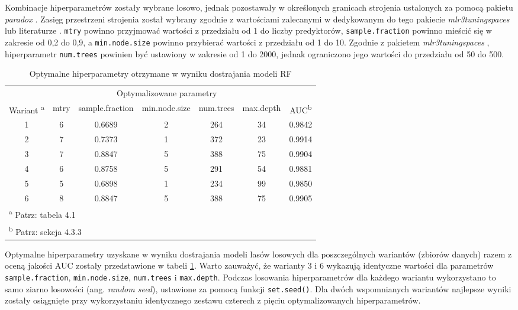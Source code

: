 \documentclass{amuthesis}
\begin{document}
Kombinacje hiperparametrów zostały wybrane losowo, jednak pozostawały w
określonych granicach strojenia ustalonych za pomocą pakietu
\emph{paradox} \autocite{R-paradox}. Zasięg przestrzeni strojenia został
wybrany zgodnie z wartościami zalecanymi w dedykowanym do tego pakiecie
\emph{mlr3tuningspaces} \autocite{R-mlr3tuningspaces} lub literaturze
\autocite{probst_2019_hyperparameters,schratz_2019_hyperparameters}.
\texttt{mtry} powinno przyjmować wartości z przedziału od 1 do liczby
predyktorów, \texttt{sample.fraction} powinno mieścić się w zakresie od
0,2 do 0,9, a \texttt{min.node.size} powinno przybierać wartości z
przedziału od 1 do 10. Zgodnie z pakietem \emph{mlr3tuningspaces}
\autocite{R-mlr3tuningspaces}, hiperparametr \texttt{num.trees} powinien
być ustawiony w zakresie od 1 do 2000, jednak ograniczono jego wartości
do przedziału od 50 do 500.

\hypertarget{tbl-tabela-tuning}{}
\begin{table}
\caption{\label{tbl-tabela-tuning}Optymalne hiperparametry otrzymane w wyniku dostrajania modeli RF }\tabularnewline

\centering
\begin{tabular}{ccccccc}
\toprule
\multicolumn{1}{c}{ } & \multicolumn{5}{c}{Optymalizowane parametry} & \multicolumn{1}{c}{ } \\
\cmidrule(l{3pt}r{3pt}){2-6}
Wariant \textsuperscript{a} & mtry & sample.fraction & min.node.size & num.trees & max.depth & AUC\textsuperscript{b}\\
\midrule
1 & 6 & 0.6689 & 2 & 264 & 34 & 0.9842\\
2 & 7 & 0.7373 & 1 & 372 & 23 & 0.9914\\
3 & 7 & 0.8847 & 5 & 388 & 75 & 0.9904\\
4 & 6 & 0.8758 & 5 & 291 & 54 & 0.9881\\
5 & 5 & 0.6898 & 1 & 234 & 99 & 0.9850\\
6 & 8 & 0.8847 & 5 & 388 & 75 & 0.9905\\
\bottomrule
\multicolumn{7}{l}{\textsuperscript{a} Patrz: tabela 4.1}\\
\multicolumn{7}{l}{\textsuperscript{b} Patrz: sekcja 4.3.3}\\
\end{tabular}
\end{table}

Optymalne hiperparametry uzyskane w wyniku dostrajania modeli lasów
losowych dla poszczególnych wariantów (zbiorów danych) razem z oceną
jakości AUC zostały przedstawione w tabeli \ref{tbl-tabela-tuning}.
Warto zauważyć, że warianty 3 i 6 wykazują identyczne wartości dla
parametrów \texttt{sample.fraction}, \texttt{min.node.size},
\texttt{num.trees} i \texttt{max.depth}. Podczas losowania
hiperparametrów dla każdego wariantu wykorzystano to samo ziarno
losowości (ang. \emph{random seed}), ustawione za pomocą funkcji
\texttt{set.seed()}. Dla dwóch wspomnianych wariantów najlepsze wyniki
zostały osiągnięte przy wykorzystaniu identycznego zestawu czterech z
pięciu optymalizowanych hiperparametrów.
\end{document}
